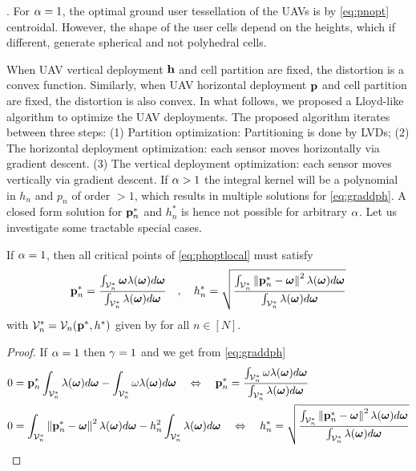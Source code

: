 \documentclass[smallabstract,smallcaptions]{dccpaper}
\newenvironment{remark}{\par\vspace{1.5ex}\noindent{\em Remark\/}.}{\par\vspace{1.5ex}}
\newcommand{\df}{\ensuremath{\lam}}         %
\newcommand{\bP}{\ensuremath{\vp}}          %
\newcommand{\bH}{\ensuremath{\vh}}          %
\newcommand{\Vor}{\ensuremath{\mathcal{V}}}         %
\begin{document}
%
\fi
\begin{remark}
  For $\alpha=1$, the optimal ground user tessellation of the UAVs is by \eqref{eq:pnopt} centroidal. However, the shape of
  the user cells depend on the heights, which if different, generate spherical and not polyhedral cells. 
\end{remark}

When UAV vertical deployment $\bH$ and cell partition are fixed, the distortion is a convex function.  Similarly, when
UAV horizontal deployment $\bP$ and cell partition are fixed, the distortion is also convex.  In what follows,
we proposed a Lloyd-like algorithm to optimize the UAV deployments.  The proposed algorithm iterates between three
steps: (1) Partition optimization: Partitioning is done by LVDs; (2) The horizontal deployment optimization: each sensor
moves horizontally via gradient descent.  (3) The vertical deployment optimization: each sensor moves vertically via
gradient descent.
\fi %
If $\alpha>1$ the integral kernel will be a polynomial in $h_n$ and $p_n$ of order $>1$, which results in multiple
solutions for \eqref{eq:graddph}. A closed form solution for ${\mathbf p}_n^*$ and $h_n^*$ is hence not possible for arbitrary
$\alpha$. Let us investigate some tractable special cases.   
%
\begin{corollary}\label{cor:alponedifheight}
  If $\alpha=1$, then all critical points  of \eqref{eq:phoptlocal} must satisfy 
  \begin{align}
    \vp_n^* = \frac{\int_{\Vor^*_n} \vome \df(\vome)d\vome}{\int_{\Vor^*_n} \df(\vome)d\vome}\quad,\quad 
    h_n^* = \sqrt{\frac{\int_{\Vor^*_n}\Norm{\vp_n^*-\vome}^2 \df(\vome)d\vome}{\int_{\Vor^*_n} \df(\vome)d\vome}}\label{eq:pnhn}
  \end{align}
  with  $\Vor_n^*=\Vor_n(\vp^*,h^*)$ given by  for all $n\in[N]$.
\end{corollary}
%
\begin{proof}
  If $\alpha=1$ then $\gamma=1$ and we get from \eqref{eq:graddph}
  \begin{align}
    &0= \vp_n^*\int_{\Vor^*_n} \df(\vome)d\vome- \int_{\Vor_n^*} \ome\df(\vome)d\vome
   \quad \LRA\quad 
    \vp_n^*= \frac{\int_{\Vor_n^*} \ome\df(\vome)d\vome}{\int_{\Vor^*_n} \df(\vome)d\vome }\\
    &0= \int_{\Vor_n^*} \Norm{\vp_n^*-\vome}^2 \df(\vome) d\vome - h_n^2\int_{\Vor^*_n}  \df(\vome)d \vome
   \quad \LRA \quad
    h_n^*= \sqrt{\frac{\int_{\Vor_n^*} \Norm{\vp_n^*-\vome}^2\df(\vome)d\vome}{\int_{\Vor^*_n}  \df(\vome)d\vome }}
  \end{align}
\end{proof}
\fi %
%
\end{document}
